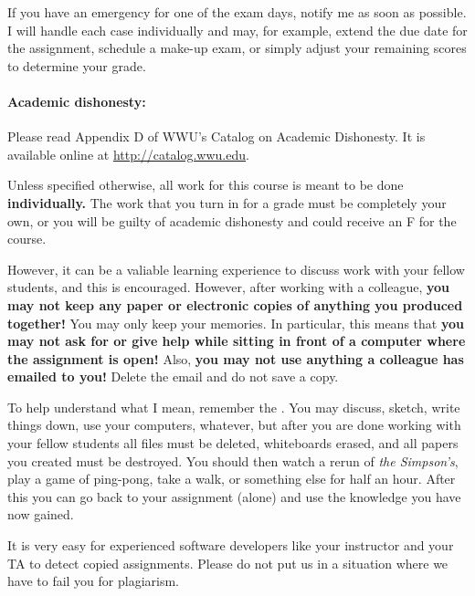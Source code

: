 \documentclass{article}
\begin{document}
  If you have an emergency for one of the exam days, notify me as soon
  as possible.  I will handle each case individually and may, for
  example, extend the due date for the assignment, schedule a make-up
  exam, or simply adjust your remaining scores to determine your
  grade.

\paragraph{Academic dishonesty:} Please read Appendix D of WWU's Catalog on
  Academic Dishonesty.  It is available online at
  \url{http://catalog.wwu.edu}.

  Unless specified otherwise, all work for this course is meant to
  be done {\bf individually.}  The work that you turn in for a grade
  must be completely your own, or you will be guilty of academic
  dishonesty and could receive an F for the course.

  However, it can be a valiable learning experience to discuss
  work with your fellow students, and this is encouraged.
  However, after working with a colleague, {\bf you may not keep any
    paper or electronic copies of anything you produced together!}
  You may only keep your memories.  In particular, this means that
  {\bf you may not ask for or give help while sitting in front of a
    computer where the assignment is open!}  Also, {\bf you may not
    use anything a colleague has emailed to you!}  Delete the email
  and do not save a copy.

  To help understand what I mean, remember the .  You may discuss, sketch, write things down, use
  your computers, whatever, but after you are done working with your
  fellow students all files must be deleted, whiteboards erased, and
  all papers you created must be destroyed.  You should then watch a
  rerun of {\em the Simpson's}, play a game of ping-pong, take a walk,
  or something else for half an hour. After this you can go back to
  your assignment (alone) and use the knowledge you have now gained.

  It is very easy for experienced software developers like your
  instructor and your TA to detect copied assignments.  Please do not
  put us in a situation where we have to fail you for plagiarism.
\end{document}
